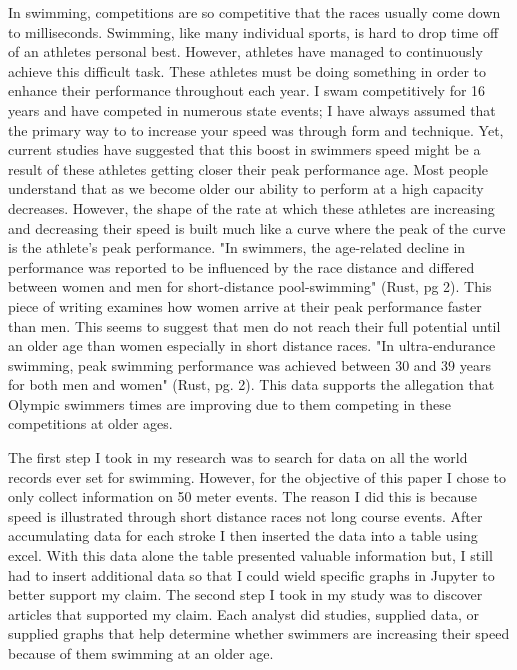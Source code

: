 \documentclass[letterpaper, 10 pt, conference]{ieeeconf}  %
\begin{document}
In swimming, competitions are so competitive that the races usually come down to milliseconds. Swimming, like many individual sports, is hard to drop time off of an athletes personal best. However, athletes have managed to continuously achieve this difficult task. These athletes must be doing something in order to enhance their performance throughout each year. I swam competitively for 16 years and have competed in numerous state events; I have always assumed that the primary way to to increase your speed was through form and technique. Yet, current studies have suggested that this boost in swimmers speed might be a result of these athletes getting closer their peak performance age. Most people understand that as we become older our ability to perform at a high capacity decreases. However, the shape of the rate at which these athletes are increasing and decreasing their speed is built much like a curve where the peak of the curve is the athlete's peak performance. "In swimmers, the age-related decline in performance was reported to be influenced by the race distance and differed between women and men for short-distance pool-swimming" (Rust, pg 2). This piece of writing examines how women arrive at their peak performance faster than men. This seems to suggest that men do not reach their full potential until an older age than women especially in short distance races.  "In ultra-endurance swimming, peak swimming performance was achieved between 30 and 39 years for both men and women" (Rust, pg. 2). This data supports the allegation that Olympic swimmers times are improving due to them competing in these competitions at older ages. 

The first step I took in my research was to search for data on all the world records ever set for swimming. However, for the objective of this paper I chose to only collect information on 50 meter events. The reason I did this is because speed is illustrated through short distance races not long course events. After accumulating data for each stroke I then inserted the data into a table using excel. With this data alone the table presented valuable information but, I still
had to insert additional data so that I could wield specific graphs in Jupyter to better support my claim. The second step I took in my study was to discover articles that supported my claim. Each analyst did studies, supplied data, or supplied graphs that help determine whether swimmers are increasing their speed because of them swimming at an older age. 
\end{document}
